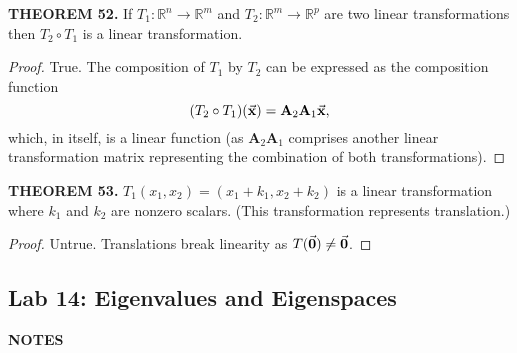 \documentclass[12pt]{article}
\newcommand{\mat}[1]{\mathbf{#1}}
\newcommand{\theorem}[2]{\textbf{THEOREM #1.} #2}
\newcommand{\notes}{\textbf{NOTES}}
\begin{document}
\theorem{52}{If $T_{1} : \mathbb{R}^{n} \to \mathbb{R}^{m}$ and $T_{2} : \mathbb{R}^{m} \to \mathbb{R}^{p}$ are two linear transformations then $T_{2} \circ T_{1}$ is a linear transformation.}

\begin{proof}
True. The composition of $T_{1}$ by $T_{2}$ can be expressed as the composition function
\begin{equation*}
(T_{2} \circ T_{1})(\va{x}) = \mat{A}_{2} \mat{A}_{1} \va{x},
\end{equation*}
which, in itself, is a linear function (as $\mat{A}_{2} \mat{A}_{1}$ comprises another linear transformation matrix representing the combination of both transformations).
\end{proof}

\theorem{53}{$T_{1}(x_{1},x_{2}) = (x_{1} + k_{1}, x_{2} + k_{2})$ is a linear transformation where $k_{1}$ and $k_{2}$ are nonzero scalars. (This transformation represents translation.)}

\begin{proof}
Untrue. Translations break linearity as $T(\va{0}) \ne \va{0}$.
\end{proof}

\subsection{Lab 14: Eigenvalues and Eigenspaces}

\notes
\end{document}
